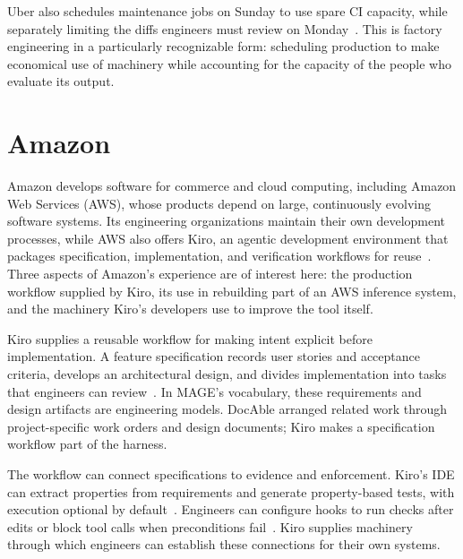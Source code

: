 Uber also schedules maintenance jobs on Sunday to use spare CI capacity, while separately limiting the diffs engineers must review on Monday~\citep{medisetty2026sdlc}. This is factory engineering in a particularly recognizable form: scheduling production to make economical use of machinery while accounting for the capacity of the people who evaluate its output.

\section{Amazon}\label{heading:amazon}

Amazon develops software for commerce and cloud computing, including Amazon Web Services (AWS), whose products depend on large, continuously evolving software systems. Its engineering organizations maintain their own development processes, while AWS also offers Kiro, an agentic development environment that packages specification, implementation, and verification workflows for reuse~\citep{kiro2026specs}. Three aspects of Amazon's experience are of interest here: the production workflow supplied by Kiro, its use in rebuilding part of an AWS inference system, and the machinery Kiro's developers use to improve the tool itself.


Kiro supplies a reusable workflow for making intent explicit before implementation. A feature specification records user stories and acceptance criteria, develops an architectural design, and divides implementation into tasks that engineers can review~\citep{kiro2026specs}. In MAGE's vocabulary, these requirements and design artifacts are engineering models. DocAble arranged related work through project-specific work orders and design documents; Kiro makes a specification workflow part of the harness.


The workflow can connect specifications to evidence and enforcement. Kiro's IDE can extract properties from requirements and generate property-based tests, with execution optional by default~\citep{kiro2026correctness}. Engineers can configure hooks to run checks after edits or block tool calls when preconditions fail~\citep{kiro2026hooks}. Kiro supplies machinery through which engineers can establish these connections for their own systems.

